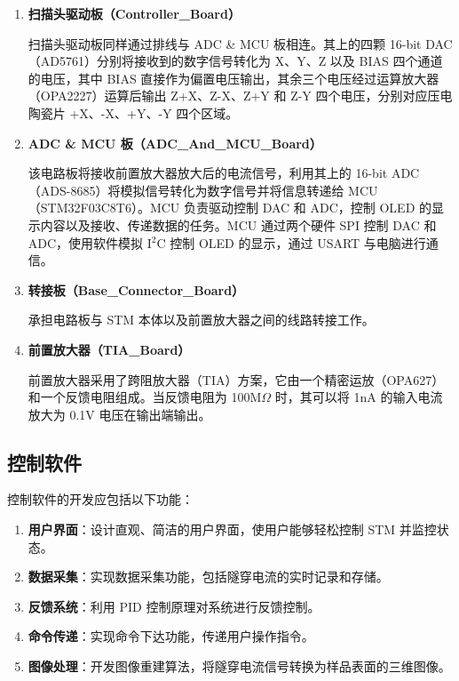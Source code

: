 \documentclass[zihao=-4]{ctexart}
\begin{document}
\begin{spacing}{1.5}
\begin{enumerate}
			\item \textbf{扫描头驱动板（Controller\_Board）}\par
			\qquad 扫描头驱动板同样通过排线与 ADC \& MCU 板相连。其上的四颗 16-bit DAC（AD5761）分别将接收到的数字信号转化为 X、Y、Z 以及 BIAS 四个通道的电压，其中 BIAS 直接作为偏置电压输出，其余三个电压经过运算放大器（OPA2227）运算后输出 Z+X、Z-X、Z+Y 和 Z-Y 四个电压，分别对应压电陶瓷片 +X、-X、+Y、-Y 四个区域。
			
			\item \textbf{ADC \& MCU 板（ADC\_And\_MCU\_Board）}\par
			\qquad 该电路板将接收前置放大器放大后的电流信号，利用其上的 16-bit ADC（ADS-8685）将模拟信号转化为数字信号并将信息转递给 MCU（STM32F03C8T6）。MCU 负责驱动控制 DAC 和 ADC，控制 OLED 的显示内容以及接收、传递数据的任务。MCU 通过两个硬件 SPI 控制 DAC 和 ADC，使用软件模拟 I$^\text{2}$C 控制 OLED 的显示，通过 USART 与电脑进行通信。
			
			\item \textbf{转接板（Base\_Connector\_Board）}\par
			\qquad 承担电路板与 STM 本体以及前置放大器之间的线路转接工作。
			
			\item \textbf{前置放大器（TIA\_Board）}\par
			\qquad 前置放大器采用了跨阻放大器（TIA）方案，它由一个精密运放（OPA627）和一个反馈电阻组成。当反馈电阻为 100M$\Omega$ 时，其可以将 1nA 的输入电流放大为 0.1V 电压在输出端输出。
			
		\end{enumerate}
		
		
	
	
	
	
	\subsection{控制软件}
		控制软件的开发应包括以下功能：
		\begin{enumerate}
			\item \textbf{用户界面}：设计直观、简洁的用户界面，使用户能够轻松控制 STM 并监控状态。
			\item \textbf{数据采集}：实现数据采集功能，包括隧穿电流的实时记录和存储。
			\item \textbf{反馈系统}：利用 PID 控制原理对系统进行反馈控制。
			\item \textbf{命令传递}：实现命令下达功能，传递用户操作指令。
			\item \textbf{图像处理}：开发图像重建算法，将隧穿电流信号转换为样品表面的三维图像。
		\end{enumerate}
		

\end{spacing}
\end{document}
